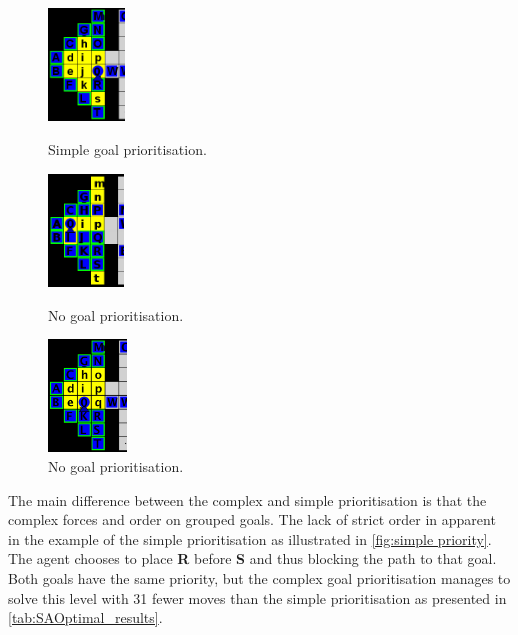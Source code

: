\begin{figure}[h!]
  \centering
  \begin{minipage}{.30\columnwidth}
    \centering
    \includegraphics[height=3cm]{graphics/simple_priority_block.PNG}
    \caption{\label{fig:simple priority}Simple goal prioritisation.}
  \end{minipage}%
  \hspace{20pt}%
  \begin{minipage}{.30\columnwidth}
    \centering
    \includegraphics[height=3cm]{graphics/no_priority_block.png}
    \caption{\label{fig:no priority}No goal prioritisation.}
  \end{minipage}%
  \hspace{20pt}%
  \begin{minipage}{.30\columnwidth}
    \centering
    \includegraphics[height=3cm]{graphics/complex_priority.png}
    \caption{\label{fig:no priority}No goal prioritisation.}
  \end{minipage}
\end{figure}


The main difference between the complex and simple prioritisation is that the complex forces and order on grouped goals.
The lack of strict order in apparent in the example of the simple prioritisation as illustrated in \cref{fig:simple priority}.
The agent chooses to place \textbf{R} before \textbf{S} and thus blocking the path to that goal.
Both goals have the same priority, but the complex goal prioritisation manages to solve this level with 31 fewer moves than the simple prioritisation as presented in \cref{tab:SAOptimal_results}.

